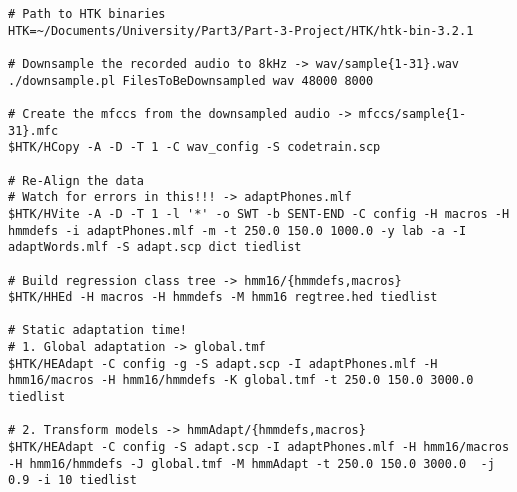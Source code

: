 \begin{lstlisting}[]
# Path to HTK binaries
HTK=~/Documents/University/Part3/Part-3-Project/HTK/htk-bin-3.2.1

# Downsample the recorded audio to 8kHz -> wav/sample{1-31}.wav
./downsample.pl FilesToBeDownsampled wav 48000 8000

# Create the mfccs from the downsampled audio -> mfccs/sample{1-31}.mfc
$HTK/HCopy -A -D -T 1 -C wav_config -S codetrain.scp

# Re-Align the data
# Watch for errors in this!!! -> adaptPhones.mlf
$HTK/HVite -A -D -T 1 -l '*' -o SWT -b SENT-END -C config -H macros -H hmmdefs -i adaptPhones.mlf -m -t 250.0 150.0 1000.0 -y lab -a -I adaptWords.mlf -S adapt.scp dict tiedlist

# Build regression class tree -> hmm16/{hmmdefs,macros}
$HTK/HHEd -H macros -H hmmdefs -M hmm16 regtree.hed tiedlist

# Static adaptation time!
# 1. Global adaptation -> global.tmf
$HTK/HEAdapt -C config -g -S adapt.scp -I adaptPhones.mlf -H hmm16/macros -H hmm16/hmmdefs -K global.tmf -t 250.0 150.0 3000.0 tiedlist

# 2. Transform models -> hmmAdapt/{hmmdefs,macros}
$HTK/HEAdapt -C config -S adapt.scp -I adaptPhones.mlf -H hmm16/macros -H hmm16/hmmdefs -J global.tmf -M hmmAdapt -t 250.0 150.0 3000.0  -j 0.9 -i 10 tiedlist
\end{lstlisting}



